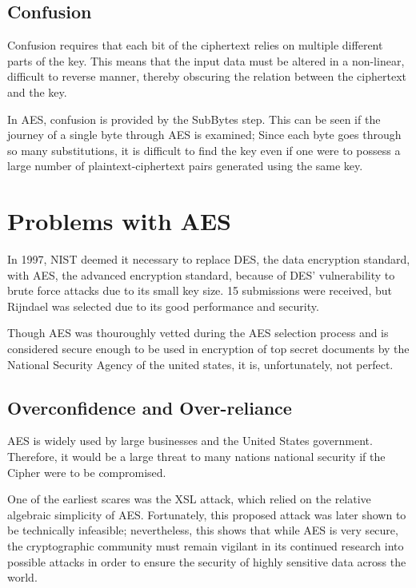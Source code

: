 \documentclass[12pt, a4paper]{report}
\theoremstyle{definition}
\theoremstyle{remark}
\begin{document}
\subsection{Confusion}
Confusion requires that each bit of the ciphertext relies on multiple different parts of the key. This means that the input data must be altered in a non-linear, difficult to reverse manner, thereby obscuring the relation between the ciphertext and the key\cite{Confusion}.

In AES, confusion is provided by the SubBytes step. This can be seen if the journey of a single byte through AES is examined; Since each byte goes through so many substitutions, it is difficult to find the key even if one were to possess a large number of plaintext-ciphertext pairs generated using the same key.

\section{Problems with AES}
In 1997, NIST deemed it necessary to replace DES, the data encryption standard, with AES, the advanced encryption standard, because of DES' vulnerability to brute force attacks due to its small key size. 15 submissions were received, but Rijndael was selected due to its good performance and security\cite{AESSelection}.

Though AES was thouroughly vetted during the AES selection process and is considered secure enough to be used in encryption of top secret documents by the National Security Agency\cite{CNSSPolicy} of the united states, it is, unfortunately, not perfect.

\subsection{Overconfidence and Over-reliance}
AES is widely used by large businesses and the United States government. Therefore, it would be a large threat to many nations national security if the Cipher were to be compromised.

One of the earliest scares was the XSL attack, which relied on the relative algebraic simplicity of AES\cite{XSL}. Fortunately, this proposed attack was later shown to be technically infeasible\cite{XLSRebuked}; nevertheless, this shows that while AES is very secure, the cryptographic community must remain vigilant in its continued research into possible attacks in order to ensure the security of highly sensitive data across the world.
\end{document}
